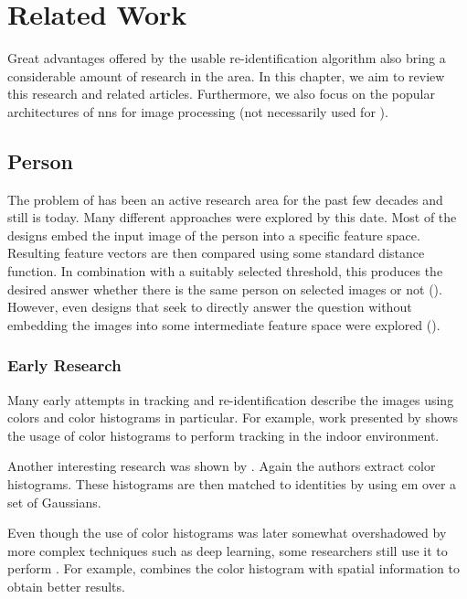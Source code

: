 \chapter{Related Work}


Great advantages offered by the usable re-identification algorithm also bring a considerable amount of research in the area. In this chapter, we aim to review this research and related articles. Furthermore, we also focus on the popular architectures of \glspl{nn} for image processing (not necessarily used for \reid{}).


\section{Person \Reid{}}

\label{sec:person_reid}

The problem of \reid{} has been an active research area for the past few decades and still is today. Many different approaches were explored by this date. Most of the designs embed the input image of the person into a specific feature space. Resulting feature vectors are then compared using some standard distance function. In combination with a suitably selected threshold, this produces the desired answer whether there is the same person on selected images or not (\cite{cheng2016person}). However, even designs that seek to directly answer the question without embedding the images into some intermediate feature space were explored (\cite{li2014deepreid}).

\subsection{Early Research}
\label{sec:early_research}

Many early attempts in tracking and re-identification describe the images using colors and color histograms in particular. For example, work presented by \cite{krumm2000multi} shows the usage of color histograms to perform tracking in the indoor environment.

Another interesting research was shown by \cite{orwell1999multi}. Again the authors extract color histograms. These histograms are then matched to identities by using \gls{em} over a set of Gaussians.

Even though the use of color histograms was later somewhat overshadowed by more complex techniques such as deep learning, some researchers still use it to perform \reid{}. For example, \cite{zeng2014person} combines the color histogram with spatial information to obtain better results.

